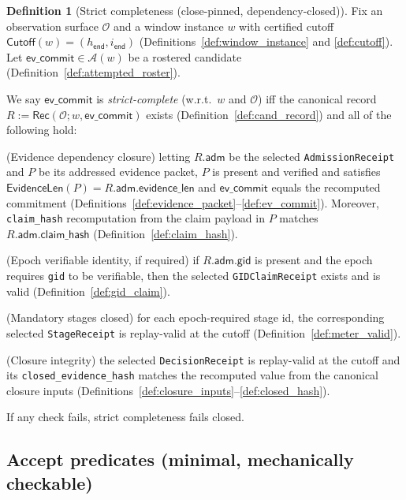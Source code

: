 \documentclass[11pt]{article}
\newcommand{\code}[1]{\texttt{#1}}
\newcommand{\term}[1]{\emph{#1}}
\newcommand{\1}{\mathbf{1}}
\theoremstyle{definition}
\newtheorem{definition}{Definition}
\theoremstyle{plain}
\begin{document}
\begin{definition}[Strict completeness (close-pinned, dependency-closed)]
\label{def:complete_strict}
Fix an observation surface $\mathcal{O}$ and a window instance $w$ with certified cutoff $\textsf{Cutoff}(w)=(h_{\textsf{end}},i_{\textsf{end}})$ (Definitions~\ref{def:window_instance} and \ref{def:cutoff}).
Let $\textsf{ev\_commit}\in\mathcal{A}(w)$ be a rostered candidate (Definition~\ref{def:attempted_roster}).

We say $\textsf{ev\_commit}$ is \term{strict-complete} (w.r.t.\ $w$ and $\mathcal{O}$) iff the canonical record
$R:=\mathsf{Rec}(\mathcal{O};w,\textsf{ev\_commit})$ exists (Definition~\ref{def:cand_record}) and all of the following hold:
\begin{tightitemize}
\item[(i)] (Evidence dependency closure) letting $R.\textsf{adm}$ be the selected \code{AdmissionReceipt} and $P$ be its addressed evidence packet, $P$ is present and verified and satisfies
$\mathsf{EvidenceLen}(P)=R.\textsf{adm}.\textsf{evidence\_len}$ and $\textsf{ev\_commit}$ equals the recomputed commitment (Definitions~\ref{def:evidence_packet}--\ref{def:ev_commit}).
Moreover, \code{claim\_hash} recomputation from the claim payload in $P$ matches $R.\textsf{adm}.\textsf{claim\_hash}$ (Definition~\ref{def:claim_hash}).
\item[(ii)] (Epoch verifiable identity, if required) if $R.\textsf{adm}.\textsf{gid}$ is present and the epoch requires \code{gid} to be verifiable, then the selected \code{GIDClaimReceipt} exists and is valid (Definition~\ref{def:gid_claim}).
\item[(iii)] (Mandatory stages closed) for each epoch-required stage id, the corresponding selected \code{StageReceipt} is replay-valid at the cutoff (Definition~\ref{def:meter_valid}).
\item[(iv)] (Closure integrity) the selected \code{DecisionReceipt} is replay-valid at the cutoff and its \code{closed\_evidence\_hash} matches the recomputed value from the canonical closure inputs (Definitions~\ref{def:closure_inputs}--\ref{def:closed_hash}).
\end{tightitemize}
If any check fails, strict completeness fails closed.
\end{definition}

\subsection{Accept predicates (minimal, mechanically checkable)}
\end{document}
